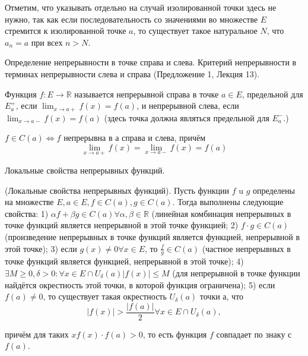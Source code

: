 Отметим, что указывать отдельно на случай изолированной точки здесь не нужно, так как если последовательность со значениями во множестве $E$ стремится к изолированной точке $a$, то существует такое натуральное $N$, что $a_n=a$ при всех $n>N$.

\newpage
\begin{problem}
Определение непрерывности в точке справа и слева. Критерий непрерывности в терминах непрерывности слева и справа (Предложение 1, Лекция 13).
\end{problem}

\begin{definition}
    Функция $f: E \rightarrow \mathbb{R}$ называется непрерывной справа в точке $a \in E$, предельной для $E_a^{+}$, если $\lim _{x \rightarrow a+} f(x)=f(a)$, и непрерывной слева, если $\lim _{x \rightarrow a-} f(x)=f(a)$ (здесь точка должна являться предельной для $E_a^{-}$.)
\end{definition}

\begin{proposition}
    $f \in C(a) \Leftrightarrow f$ непрерывна в а справа и слева, причём
    $$
        \lim _{x \rightarrow a+} f(x)=\lim _{x \rightarrow a-} f(x)=f(a)
    $$
\end{proposition}

\newpage
\begin{problem}
Локальные свойства непрерывных функций.
\end{problem}

\begin{proposition}
    (Локальные свойства непрерывных функций). Пусть функции $f$ u $g$ определены на множестве $E, a \in E, f \in C(a), g \in C(a)$. Тогда выполнены следующие свойства:
    1) $\alpha f+\beta g \in C(a) \forall \alpha, \beta \in \mathbb{R}$ (линейная комбинация непрерывных в точке функций является непрерывной в этой точке функцией;
    2) $f \cdot g \in C(a)$ (произведение непрерывных в точке функций является функцией, непрерывной в этой точке);
    3) если $g(x) \neq 0 \forall x \in E$, то $\frac{f}{g} \in C(a)$ (частное непрерывных в точке функций является функцией, непрерывной в этой точке);
    4) $\exists M \geq 0, \delta>0: \forall x \in E \cap U_\delta(a)|f(x)| \leq M$ (для непрерывной в точке функции найдётся окрестность этой точки, в которой функция ограничена);
    5) если $f(a) \neq 0$, то существует такая окрестность $U_\delta(a)$ точки а, что
    $$
        |f(x)|>\frac{|f(a)|}{2} \forall x \in E \cap U_\delta(a),
    $$

    причём для таких $x f(x) \cdot f(a)>0$, то есть функция $f$ совпадает по знаку с $f(a)$.
\end{proposition}


